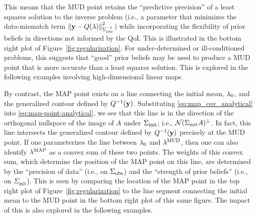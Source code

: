 This means that the MUD point retains the ``predictive precision'' of a least squares solution to the inverse problem (i.e., a parameter that minimizes the data-mismatch term $\left\Vert\mathbf{y} - Q(\lambda)\right\Vert_{\Sigma_\text{obs}^{-1}}^2$) while incorporating the flexibility of prior beliefs in directions not informed by the QoI.
This is illustrated in the bottom right plot of Figure~\ref{fig:regularization}.
For under-determined or ill-conditioned problems, this suggests that ``good'' prior beliefs may be used to produce a MUD point that is more accurate than a least squares solution.
This is explored in the following examples involving high-dimensional linear maps.

By contrast, the MAP point exists on a line connecting the initial mean, $\lambda_0$, and the generalized contour defined by $Q^{-1}(\mathbf{y})$.
Substituting \eqref{eq:map_cov_analytical} into \eqref{eq:map-point-analytical}, we see that this line is in the direction of the orthogonal nullspace of the image of $A$ under $\Sigma_\text{init}$; i.e., $\mathcal{N}(\Sigma_\text{init} A)^\perp$.
In fact, this line intersects the generalized contour defined by $Q^{-1}(\mathbf{y})$ precisely at the MUD point.
If one parameterizes the line between $\lambda_0$ and $\lambda^{\text{MUD}}$, then one can also identify $\lambda^{\text{MAP}}$ as a convex sum of these two points.
The weights of this convex sum, which determine the position of the MAP point on this line, are determined by the ``precision of data'' (i.e., on $\Sigma_\text{obs}$) and the ``strength of prior beliefs'' (i.e., on $\Sigma_{\text{init}}$).
This is seen by comparing the location of the MAP point in the top right plot of Figure~\ref{fig:regularization} to the line segment connecting the initial mean to the MUD point in the bottom right plot of this same figure.
The impact of this is also explored in the following examples.


